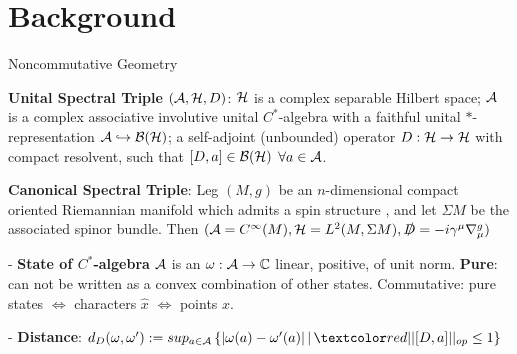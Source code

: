 \section{Background}

\begin{frame}{Noncommutative Geometry} %
    
    \textbf{Unital Spectral Triple} $(\mathcal A , \mathcal H, D)$: $\mathcal H$ is a complex separable Hilbert space; $\mathcal A$ is a complex associative involutive unital $C^*$-algebra with a faithful unital $*$-representation $\mathcal A \hookrightarrow \mathcal B(\mathcal H)$; a self-adjoint (unbounded) operator $D: \mathcal H \to \mathcal H$ with compact resolvent, such that $[D, a] \in \mathcal B(\mathcal H)$ $\forall a \in \mathcal A$.
    
    \textbf{Canonical Spectral Triple}: Leg $(M, g)$ be an $n$-dimensional compact oriented Riemannian manifold which admits a spin structure%
    , and let $\Sigma M$ %
    be the associated spinor bundle. Then $(\mathcal A = C^\infty(M), \mathcal H = L^2(M, \Sigma M), \slashed D = -i \gamma^\mu \nabla^g_\mu)$%
    
    - \textbf{State of $C^*$-algebra} $\mathcal A$ is an $\omega : \mathcal A \to \mathbb C$ linear, positive, of unit norm. \textbf{Pure}: can not be written as a convex combination of other states. Commutative: pure states $\Longleftrightarrow$ characters $\hat x$ $\Longleftrightarrow$ points $x$.
    
    - \textbf{Distance}: $d_D(\omega, \omega') := sup_{a \in \acal} \left\{|\omega(a) - \omega'(a)| \, | \, \rtext{||[D, a]||_{op} \leq 1} \right\}$
    
\end{frame}

